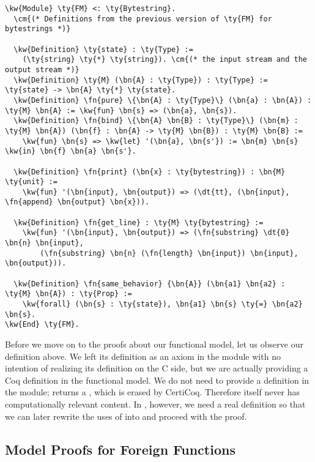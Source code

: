 \begin{Verbatim}
\kw{Module} \ty{FM} <: \ty{Bytestring}.
  \cm{(* Definitions from the previous version of \ty{FM} for bytestrings *)}

  \kw{Definition} \ty{state} : \ty{Type} :=
    (\ty{string} \ty{*} \ty{string}). \cm{(* the input stream and the output stream *)}
  \kw{Definition} \ty{M} (\bn{A} : \ty{Type}) : \ty{Type} := \ty{state} -> \bn{A} \ty{*} \ty{state}.
  \kw{Definition} \fn{pure} \{\bn{A} : \ty{Type}\} (\bn{a} : \bn{A}) : \ty{M} \bn{A} := \kw{fun} \bn{s} => (\bn{a}, \bn{s}).
  \kw{Definition} \fn{bind} \{\bn{A} \bn{B} : \ty{Type}\} (\bn{m} : \ty{M} \bn{A}) (\bn{f} : \bn{A} -> \ty{M} \bn{B}) : \ty{M} \bn{B} :=
    \kw{fun} \bn{s} => \kw{let} '(\bn{a}, \bn{s'}) := \bn{m} \bn{s} \kw{in} \bn{f} \bn{a} \bn{s'}.

  \kw{Definition} \fn{print} (\bn{x} : \ty{bytestring}) : \bn{M} \ty{unit} :=
    \kw{fun} '(\bn{input}, \bn{output}) => (\dt{tt}, (\bn{input}, \fn{append} \bn{output} \bn{x})).

  \kw{Definition} \fn{get_line} : \ty{M} \ty{bytestring} :=
    \kw{fun} '(\bn{input}, \bn{output}) => (\fn{substring} \dt{0} \bn{n} \bn{input},
        (\fn{substring} \bn{n} (\fn{length} \bn{input}) \bn{input}, \bn{output})).

  \kw{Definition} \fn{same_behavior} {\bn{A}} (\bn{a1} \bn{a2} : \ty{M} \bn{A}) : \ty{Prop} :=
    \kw{forall} (\bn{s} : \ty{state}), \bn{a1} \bn{s} \ty{=} \bn{a2} \bn{s}.
\kw{End} \ty{FM}.
\end{Verbatim}

Before we move on to the proofs about our \gls{functional model}, let us observe our  definition above. We left its definition as an axiom in the  module with no intention of realizing its definition on the C side, but we are actually providing a Coq definition in the \gls{functional model}. We do not need to provide a definition in the  module;  returns a , which is erased by CertiCoq. Therefore  itself never has computationally relevant content. In , however, we need a real definition so that we can later rewrite the uses of  into  and proceed with the proof.

\subsection{Model Proofs for Foreign Functions}
\label{modelproofseffects}

